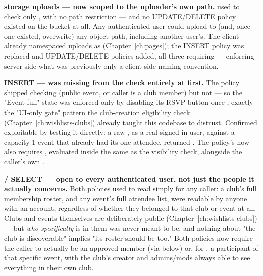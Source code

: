 \begin{olknote}
\textbf{ storage uploads — now scoped to the uploader's own path.}  used to check only , with no path restriction — and no UPDATE/DELETE policy existed on the bucket at all. Any authenticated user could upload to (and, once one existed, overwrite) any object path, including another user's. The client already namespaced uploads as  (Chapter~\ref{ch:pages}); the INSERT policy was replaced and UPDATE/DELETE policies added, all three requiring  — enforcing server-side what was previously only a client-side naming convention.
\end{olknote}

\begin{olknote}
\textbf{ INSERT —  was missing from the check entirely at first.} The policy shipped checking  (public event, or caller is a club member) but not  — so the "Event full" state was enforced only by  disabling its RSVP button once , exactly the "UI-only gate" pattern the club-creation eligibility check (Chapter~\ref{ch:wishlists-clubs}) already taught this codebase to distrust. Confirmed exploitable by testing it directly: a raw , as a real signed-in user, against a capacity-1 event that already had its one attendee, returned . The policy's  now also requires , evaluated inside the same  as the visibility check, alongside the caller's own .
\end{olknote}

\begin{olknote}
\textbf{/ SELECT — open to every authenticated user, not just the people it actually concerns.} Both policies used to read simply  for any  caller: a club's full membership roster, and any event's full attendee list, were readable by anyone with an account, regardless of whether they belonged to that club or event at all. Clubs and events themselves are deliberately public (Chapter~\ref{ch:wishlists-clubs}) — but \emph{who specifically} is in them was never meant to be, and nothing about "the club is discoverable" implies "its roster should be too." Both policies now require the caller to actually be an approved member (via  below) or, for , a participant of that specific event, with the club's creator and admins/mods always able to see everything in their own club.
\end{olknote}

